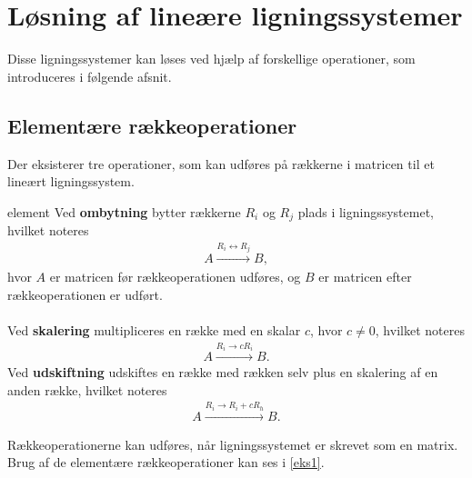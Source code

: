 \section{Løsning af lineære ligningssystemer}
%
Disse ligningssystemer kan løses ved hjælp af forskellige operationer,
som introduceres i følgende afsnit.
%
\subsection{Elementære rækkeoperationer}
Der eksisterer tre operationer, som kan udføres på rækkerne i matricen til et lineært ligningssystem.
%
\begin{defn}{}{element}
Ved \textbf{ombytning} bytter rækkerne $R_i$ og $R_j$ plads i ligningssystemet, hvilket noteres
\begin{align*}
A \xrightarrow{R_i \leftrightarrow R_j} B, 
\end{align*}
hvor $A$ er matricen før rækkeoperationen udføres, og $B$ er matricen efter rækkeoperationen er udført.\\\\
Ved \textbf{skalering} multipliceres en række med en skalar $c$, hvor $c \neq 0$, hvilket noteres
\begin{align*}
A \xrightarrow{R_i \rightarrow cR_i} B.
\end{align*}
Ved \textbf{udskiftning} udskiftes en række med rækken selv plus en skalering af en anden række, hvilket noteres
\begin{align*}
A \xrightarrow{R_i \rightarrow R_i + cR_h} B.
\end{align*}
%
\end{defn}
\noindent
Rækkeoperationerne kan udføres, når ligningssystemet er skrevet som en matrix. Brug af de elementære rækkeoperationer kan ses i \ref{eks1}.
\\
%
%
